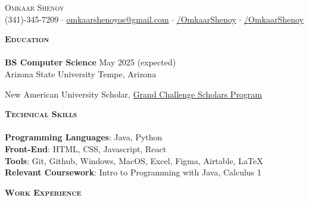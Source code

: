 \documentclass[a4paper]{article}
\newcommand{\lineunder} {
    \vspace*{-8pt} \\
    \hspace*{-18pt} \hrulefill \\
}
\newcommand{\header} [1] {
    {\hspace*{-15pt}\vspace*{3pt} \textsc{#1}}
    \vspace*{-6pt} \lineunder
}
\begin{document}
\vspace*{-30.9pt}

    


\begin{center}
	{\Huge \scshape {Omkaar Shenoy}}\\
	\vspace{2mm}
	\faPhone  \hspace{0.5mm} (341)-345-7209 $\cdot$ \href{mailto:omkaarshenoyos@gmail.com}{\faEnvelope \hspace{0.5mm} omkaarshenoyos@gmail.com} \hspace{0.5mm}   $\cdot$ \href{https://www.linkedin.com/in/OmkaarShenoy/}{\faLinkedin/OmkaarShenoy} $\cdot$ \href{https://github.com/OmkaarShenoy}{\faGithub/OmkaarShenoy}
	
\end{center}




    \header{\textbf{Education}}

\textbf{BS Computer Science} \hfill May 2025 (expected)
\\ Arizona State University \hfill Tempe, Arizona
 
New American University Scholar, \href{https://gcsp.engineering.asu.edu/}{Grand Challenge Scholars Program} \faExternalLink \\
\vspace{1mm}

\vspace{2mm}

    \header{\textbf{Technical Skills}}

\textbf{Programming Languages}: Java, Python \\
\textbf{Front-End}: HTML, CSS, Javascript, React \\
\textbf{Tools}: Git, Github, Windows, MacOS, Excel, Figma, Airtable, \LaTeX \\
\textbf{Relevant Coursework}: Intro to Programming with Java, Calculus 1 \\


\vspace{2mm}
    \header{\textbf{Work Experience}}
\end{document}
